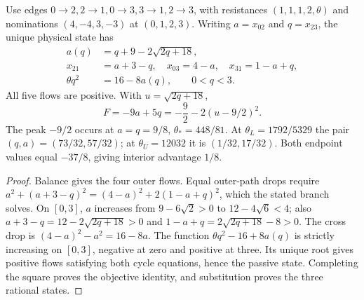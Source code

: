 \begin{lemma}
\label{lem:a-weight-theta}
Use edges $0\to2,2\to1,0\to3,3\to1,2\to3$, with resistances
$(1,1,1,2,\theta)$ and nominations $(4,-4,3,-3)$ at $(0,1,2,3)$.
Writing $a=x_{02}$ and $q=x_{23}$, the unique physical state has
\[
 \begin{split}
 a(q)&=q+9-2\sqrt{2q+18},\\
 x_{21}&=a+3-q,\quad x_{03}=4-a,\quad x_{31}=1-a+q,\\
 \theta q^2&=16-8a(q),\qquad 0<q<3.
 \end{split}
\]
All five flows are positive. With $u=\sqrt{2q+18}$,
\begin{equation}
 F=-9a+5q=-\frac92-2(u-9/2)^2.
 \label{eq:a-weight-theta}
\end{equation}
The peak $-9/2$ occurs at $a=q=9/8$, $\theta_*=448/81$.
At $\theta_L=1792/5329$ the pair $(q,a)=(73/32,57/32)$;
at $\theta_U=12032$ it is $(1/32,17/32)$.
Both endpoint values equal $-37/8$, giving interior advantage $1/8$.
\end{lemma}
\begin{proof}
Balance gives the four outer flows. Equal outer-path drops require
$a^2+(a+3-q)^2=(4-a)^2+2(1-a+q)^2$, which the stated branch solves.
On $[0,3]$, $a$ increases from $9-6\sqrt2>0$ to
$12-4\sqrt6<4$; also
$a+3-q=12-2\sqrt{2q+18}>0$ and
$1-a+q=2\sqrt{2q+18}-8>0$.
The cross drop is $(4-a)^2-a^2=16-8a$.
The function $\theta q^2-16+8a(q)$ is strictly increasing on $[0,3]$,
negative at zero and positive at three. Its unique root gives positive
flows satisfying both cycle equations, hence the passive state.
Completing the square proves the objective identity, and substitution
proves the three rational states.
\end{proof}

